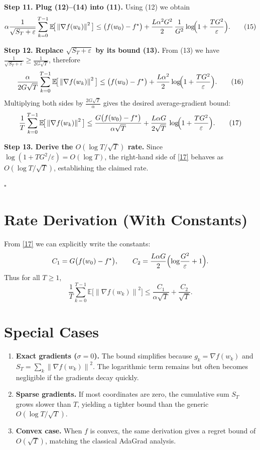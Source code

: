 \documentclass{article}
\newcommand{\E}{\mathbb{E}}
\newcommand{\norm}[1]{\left\lVert#1\right\rVert}
\begin{document}
\noindent\textbf{Step 11. Plug (12)–(14) into (11).}  
Using (12) we obtain
\[
\alpha\frac{1}{\sqrt{S_T+\varepsilon}}
\sum_{k=0}^{T-1}\E\!\big[\norm{\nabla f(w_k)}^{2}\big]
\le
\big(f(w_0)-f^{\star}\big)
+\frac{L\alpha^{2}G^{2}}{2}\,
\frac{1}{G^{2}}\log\!\Bigl(1+\frac{T G^{2}}{\varepsilon}\Bigr).
\tag{15}
\]

\noindent\textbf{Step 12. Replace $\sqrt{S_T+\varepsilon}$ by its bound (13).}  
From (13) we have $\frac{1}{\sqrt{S_T+\varepsilon}}\ge \frac{1}{2G\sqrt{T}}$, therefore
\[
\frac{\alpha}{2G\sqrt{T}}
\sum_{k=0}^{T-1}\E\!\big[\norm{\nabla f(w_k)}^{2}\big]
\le
\big(f(w_0)-f^{\star}\big)
+\frac{L\alpha^{2}}{2}\log\!\Bigl(1+\frac{T G^{2}}{\varepsilon}\Bigr).
\tag{16}
\]
Multiplying both sides by $\frac{2G\sqrt{T}}{\alpha}$ gives the desired average‑gradient bound:
\[
\frac{1}{T}\sum_{k=0}^{T-1}\E\!\big[\norm{\nabla f(w_k)}^{2}\big]
\le
\frac{G\big(f(w_0)-f^{\star}\big)}{\alpha\sqrt{T}}
+\frac{L\alpha G}{2\sqrt{T}}\,
\log\!\Bigl(1+\frac{T G^{2}}{\varepsilon}\Bigr).
\tag{17}
\]

\noindent\textbf{Step 13. Derive the $O(\log T/\sqrt{T})$ rate.}  
Since $\log(1+TG^{2}/\varepsilon)=O(\log T)$, the right‑hand side of \eqref{17} behaves as $O(\log T/\sqrt{T})$, establishing the claimed rate.

\hfill $\square$

\section*{Rate Derivation (With Constants)}
From \eqref{17} we can explicitly write the constants:
\[
C_{1}=G\big(f(w_0)-f^{\star}\big),\qquad 
C_{2}= \frac{L\alpha G}{2}\Bigl(\log\!\frac{G^{2}}{\varepsilon}+1\Bigr).
\]
Thus for all $T\ge 1$,
\[
\frac{1}{T}\sum_{k=0}^{T-1}\E\!\big[\norm{\nabla f(w_k)}^{2}\big]
\le \frac{C_{1}}{\alpha\sqrt{T}}+\frac{C_{2}}{\sqrt{T}}.
\]

\section*{Special Cases}
\begin{enumerate}[leftmargin=*]
\item \textbf{Exact gradients ($\sigma=0$).} The bound simplifies because $g_k=\nabla f(w_k)$ and $S_T=\sum_{k}\norm{\nabla f(w_k)}^{2}$. The logarithmic term remains but often becomes negligible if the gradients decay quickly.
\item \textbf{Sparse gradients.} If most coordinates are zero, the cumulative sum $S_T$ grows slower than $T$, yielding a tighter bound than the generic $O(\log T/\sqrt{T})$.
\item \textbf{Convex case.} When $f$ is convex, the same derivation gives a regret bound of $O(\sqrt{T})$, matching the classical AdaGrad analysis.
\end{enumerate}
\end{document}

